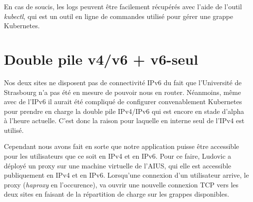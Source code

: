 En cas de soucis, les logs peuvent être facilement récupérés avec l'aide
de l'outil \textit{kubectl}, qui est un outil en ligne de commandes
utilisé pour gérer une grappe Kubernetes.

\section{Double pile v4/v6 + v6-seul}

Nos deux sites ne disposent pas de connectivité IPv6 du fait que
l'Université de Strasbourg n'a pas été en mesure de pouvoir nous en
router. Néanmoins, même avec de l'IPv6 il aurait été compliqué de
configurer convenablement Kubernetes pour prendre en charge la double
pile IPv4/IPv6 qui est encore en stade d'alpha à l'heure actuelle. C'est
donc la raison pour laquelle en interne seul de l'IPv4 est utilisé.

Cependant nous avons fait en sorte que notre application puisse être
accessible pour les utilisateurs que ce soit en IPv4 et en IPv6. Pour ce
faire, Ludovic a déployé un proxy sur une machine virtuelle de l'AIUS,
qui elle est accessible publiquement en IPv4 et en IPv6. Lorsqu'une
connexion d'un utilisateur arrive, le proxy (\textit{haproxy} en
l'occurence), va ouvrir une nouvelle connexion TCP vers les deux sites
en faisant de la répartition de charge sur les grappes disponibles.
